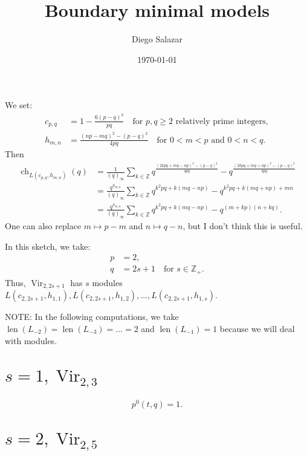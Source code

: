 \documentclass[a4paper, 12pt, reqno]{amsart}
\DeclareMathOperator{\Vir}{Vir}
\DeclareMathOperator{\ch}{ch}
\DeclareMathOperator{\len}{len}
\begin{document}
\title{Boundary minimal models}
\author{Diego Salazar}
\address{Instituto de Matemática Pura e Aplicada, Rio de Janeiro, RJ, Brazil}
\date{\today}
\maketitle

We set:
\begin{align*}
  c_{p, q} &= 1 - \frac{6(p - q)^2}{pq} \quad \text{for $p, q \ge 2$ relatively prime integers}, \\
  h_{m, n} &= \frac{(np - mq)^2 - (p - q)^2}{4pq} \quad \text{for $0 < m < p$ and $0 < n < q$.}
\end{align*}
Then
\begin{align*}
  \ch_{L(c_{p, q}, h_{m, n})}(q) &= \frac{1}{(q)_{\infty}}\sum_{k \in \mathbb{Z}}q^{\frac{(2kpq + mq - np)^2 - (p - q)^2}{4pq}} - q^{\frac{(2kpq + mq + np)^2 - (p - q)^2}{4pq}} \\
                                 &= \frac{q^{h_{m, n}}}{(q)_{\infty}}\sum_{k \in \mathbb{Z}}q^{k^2pq + k(mq - np)}-q^{k^2pq + k(mq + np) + mn} \\
                                 &= \frac{q^{h_{m, n}}}{(q)_{\infty}}\sum_{k \in \mathbb{Z}}q^{k^2pq + k(mq - np)}-q^{(m + kp)(n + kq)}.
\end{align*}
One can also replace $m \mapsto p - m$ and $n \mapsto q - n$, but I don't think this is useful.

In this sketch, we take:
\begin{align*}
  p &= 2, \\
  q &= 2s + 1 \quad \text{for $s \in \mathbb{Z}_+$}.
\end{align*}
Thus, $\Vir_{2, 2s + 1}$ has $s$ modules $L(c_{2, 2s + 1}, h_{1, 1}), L(c_{2, 2s + 1}, h_{1, 2}), \dots, L(c_{2, 2s + 1}, h_{1, s})$.

NOTE: In the following computations, we take $\len(L_{-2}) = \len(L_{-3}) = \dots = 2$ and $\len(L_{-1}) = 1$ because we will deal with modules.

\section{$s = 1, \Vir_{2, 3}$}
\label{sec:s-=-1}

\begin{equation*}
  p^0(t, q) = 1.
\end{equation*}

\section{$s = 2, \Vir_{2, 5}$}
\label{sec:vir_2-5-1}
\end{document}
